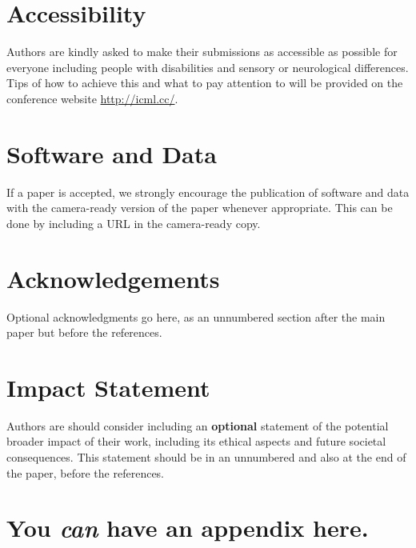 \documentclass{article}
\theoremstyle{plain}
\theoremstyle{definition}
\theoremstyle{remark}
\begin{document}
\section*{Accessibility}
Authors are kindly asked to make their submissions as accessible as possible for everyone including people with disabilities and sensory or neurological differences.
Tips of how to achieve this and what to pay attention to will be provided on the conference website \url{http://icml.cc/}.

\section*{Software and Data}

If a paper is accepted, we strongly encourage the publication of software and data with the
camera-ready version of the paper whenever appropriate. This can be
done by including a URL in the camera-ready copy. 

\section*{Acknowledgements}

Optional acknowledgments go here, as an unnumbered section after the main paper but before the references. 

\section*{Impact Statement}

Authors are should consider including an \textbf{optional} statement of the potential 
broader impact of their work, including its ethical aspects and future 
societal consequences. This statement should be in an unnumbered and also at the end of the paper, before the references. 







\newpage
\appendix
\onecolumn
\section{You \emph{can} have an appendix here.}

\end{document}
